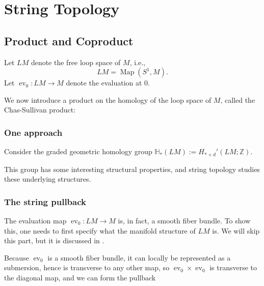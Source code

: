 \documentclass[reqno]{amsart}
\theoremstyle{definition}
\theoremstyle{remark}
\DeclareMathOperator{\Map}{Map}
\DeclareMathOperator{\ev}{ev}
\begin{document}
\newpage

\section{String Topology}














\subsection{Product and Coproduct}

Let $LM$ denote the free loop space of
$M$, i.e.,
\[
LM = \Map \left( S^{1}, M \right).
\] 
Let $\ev_0 \colon LM \to M$ denote the evaluation at $0$.

We now introduce a product on the homology of the loop space of $M$, called
the Chas-Sullivan product:

\subsubsection{One approach}

Consider the graded geometric homology group
$\mathbb{H}_* \left( LM \right) :=
H_{*+d}'\left( LM;\mathbb{Z} \right) $.

This group has some interesting structural properties, and string
topology studies these underlying structures.

\subsubsection{The string pullback}

The evaluation map $\ev_0 \colon LM \to M$ is, in fact, a smooth
fiber bundle.
To show this, one needs to first specify what the manifold
structure of $LM$ is. We will skip this part, but
it is discussed in \cite[§2.3.2]{Chataur}.


Because $\ev_0$ is a smooth fiber bundle,
it can locally be represented as a submersion, hence
is transverse to any other map, so
$\ev_0 \times \ev_0$ is transverse to the diagonal map,
and we can form the pullback 
\end{document}
